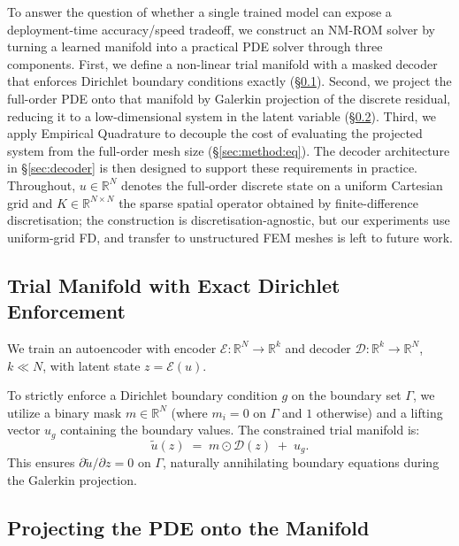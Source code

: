 \documentclass{article}
\begin{document}
To answer the question of whether a single trained model can expose a
deployment-time accuracy/speed tradeoff, we construct an NM-ROM solver
by turning a learned manifold into a practical PDE solver through
three components. First, we define a non-linear trial manifold with a
masked decoder that enforces Dirichlet boundary conditions exactly
(\S\ref{sec:method:manifold}). Second, we project the full-order PDE
onto that manifold by Galerkin projection of the discrete residual,
reducing it to a low-dimensional system in the latent variable
(\S\ref{sec:method:projection}). Third, we apply Empirical Quadrature
to decouple the cost of evaluating the projected system from the
full-order mesh size (\S\ref{sec:method:eq}). The decoder architecture
in \S\ref{sec:decoder} is then designed to support these requirements
in practice. Throughout, $u \in \mathbb{R}^N$ denotes the full-order
discrete state on a uniform Cartesian grid and
$K \in \mathbb{R}^{N \times N}$ the sparse spatial operator obtained
by finite-difference discretisation; the construction is
discretisation-agnostic, but our experiments use uniform-grid FD, and
transfer to unstructured FEM meshes is left to future work.

\subsection{Trial Manifold with Exact Dirichlet Enforcement}
\label{sec:method:manifold}

We train an autoencoder with encoder
$\mathcal{E} : \mathbb{R}^N \to \mathbb{R}^k$ and decoder
$\mathcal{D} : \mathbb{R}^k \to \mathbb{R}^N$, $k \ll N$, with latent
state $z = \mathcal{E}(u)$.

To strictly enforce a Dirichlet boundary condition $g$ on the boundary
set $\Gamma$, we utilize a binary mask $m \in \mathbb{R}^N$ (where
$m_i = 0$ on $\Gamma$ and $1$ otherwise) and a lifting vector $u_g$
containing the boundary values. The constrained trial manifold is:
\begin{equation}
  \tilde{u}(z) \;=\; m \odot \mathcal{D}(z) \;+\; u_g.
  \label{eq:masked-trial}
\end{equation}
This ensures $\partial \tilde{u}/\partial z = 0$ on $\Gamma$, naturally
annihilating boundary equations during the Galerkin projection.

\subsection{Projecting the PDE onto the Manifold}
\label{sec:method:projection}
\end{document}
